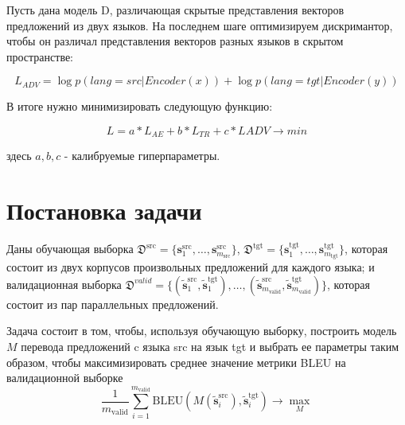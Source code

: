 \documentclass[12pt,twoside]{article}
\begin{document}
Пусть дана модель D, различающая скрытые представления векторов предложений из двух языков. На последнем шаге оптимизируем дискримантор, чтобы он различал представления векторов разных языков в скрытом пространстве:

$$L_{ADV} = \log p(lang = src| Encoder(x)) + \log p(lang = tgt|Encoder(y))$$

В итоге нужно минимизировать следующую функцию:

$$L = a*L_{AE} + b*L_{TR}+c*L{ADV} \longrightarrow min$$

здесь $a,b,c$ - калибруемые гиперпараметры.



\section{Постановка задачи}
   Даны обучающая выборка $\mathfrak{D}^{\text{src}} = \{\mathbf{s}_1^{\text{src}}, \dots, \mathbf{s}_{m_\text{src}}^{\text{src}}\}$, $\mathfrak{D}^{\text{tgt}} = \{\mathbf{s}_1^{\text{tgt}}, \dots, \mathbf{s}_{m_\text{tgt}}^{\text{tgt}}\}$, которая состоит из двух корпусов произвольных предложений для каждого языка; и валидационная выборка $\mathfrak{D}^{valid} = \{(\mathbf{\tilde{s}}_1^{\text{src}}, \mathbf{\tilde{s}}_1^{\text{tgt}}), \dots, (\mathbf{\tilde{s}}_{m_{\text{valid}}}^{\text{src}}, \mathbf{\tilde{s}}_{m_{\text{valid}}}^{\text{tgt}})\}$, которая состоит из пар параллельных предложений.
   
   Задача состоит в том, чтобы, используя обучающую выборку, построить модель $M$ перевода предложений c языка src на язык tgt и выбрать ее параметры таким образом, чтобы максимизировать среднее значение метрики BLEU на валидационной выборке 
   $$
   \frac{1}{m_{\text{valid}}} \sum_{i=1}^{m_{\text{valid}}} \text{BLEU}(M(\mathbf{\tilde{s}}_i^{\text{src}}), \mathbf{\tilde{s}}_i^{\text{tgt}}) \to \max_{M}
   $$ 
\end{document}
